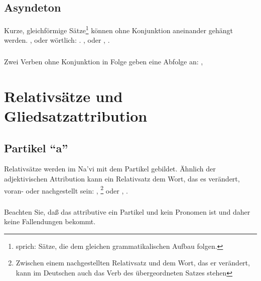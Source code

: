 \subsection{Asyndeton} Kurze, gleichf\"ormige S\"atze\footnote{sprich: S\"atze, die dem
gleichen grammatikalischen Aufbau folgen.} k\"onnen ohne Konjunktion aneinander
geh\"angt werden. ,  oder w\"ortlich: .
,
 oder ,
.

\subsubsection{} Zwei Verben ohne Konjunktion in Folge geben eine Abfolge an:
, 


\section{Relativs\"atze und Gliedsatzattribution}
\subsection{Partikel "`a"'} Relativs\"atze werden im Na’vi mit dem Partikel  gebildet.
\label{syn:a} \"Ahnlich der adjektivischen Attribution kann ein
Relativsatz dem Wort, das es ver\"andert, voran- oder nachgestellt sein: , \footnote{Zwischen einem nachgestellten Relativsatz und dem
Wort, das er ver\"andert, kann im Deutschen auch das Verb des \"ubergeordneten Satzes stehen}
oder , .

\subsubsection{} Beachten Sie, da\ss{} das attributive  ein Partikel und kein
Pronomen ist und daher keine Fallendungen bekommt.

